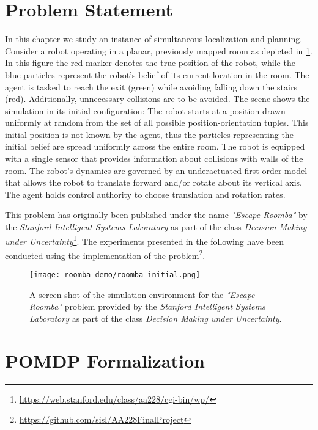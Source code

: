 \section{Problem Statement}\label{sec:lp-problem-statement}

In this chapter we study an instance of simultaneous localization and planning.
Consider a robot operating in a planar, previously mapped room as depicted in
\cref{fig:roomba-env}. In this figure the red marker denotes the true position
of the robot, while the blue particles represent the robot's belief of its
current location in the room. The agent is tasked to reach the exit (green)
while avoiding falling down the stairs (red). Additionally, unnecessary
collisions are to be avoided. The scene shows the simulation in its initial
configuration: The robot starts at a position drawn uniformly at random from
the set of all possible position-orientation tuples. This initial position is
not known by the agent, thus the particles representing the initial belief are
spread uniformly across the entire room. The robot is equipped with a single
sensor that provides information about collisions with walls of the room. The
robot's dynamics are governed by an underactuated first-order model that allows
the robot to translate forward and/or rotate about its vertical axis. The
agent holds control authority to choose translation and rotation rates.

This problem has originally been published under the name \emph{"Escape
Roomba"} by the \emph{Stanford Intelligent Systems Laboratory} as part of the
class \emph{Decision Making under
Uncertainty}\footnote{\url{https://web.stanford.edu/class/aa228/cgi-bin/wp/}}.
The experiments presented in the following have been conducted using the
\pomdpsjl implementation of the
problem\footnote{\url{https://github.com/sisl/AA228FinalProject}}.

\begin{figure}[htpb]
  \centering
  \texttt{[image: roomba\_demo/roomba-initial.png]}
  \caption{A screen shot of the simulation environment for the \emph{"Escape
  Roomba"} problem provided by the \emph{Stanford Intelligent Systems
  Laboratory} as part of the class \emph{Decision Making under Uncertainty}.}
  \label{fig:roomba-env}
\end{figure}

\clearpage
\section{POMDP Formalization}\label{sec:lp-pomdp-formalization}

